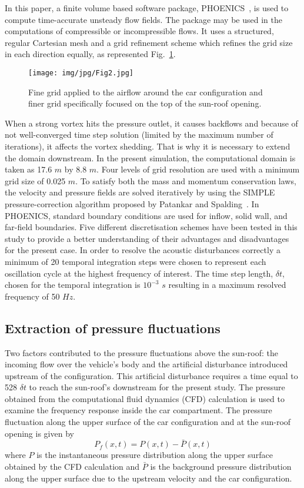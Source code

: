 \documentclass[10pt]{article}
\theoremstyle{plain}
\theoremstyle{definition}
\theoremstyle{remark}
\begin{document}
In this paper, a finite volume based software package, PHOENICS~\cite{phoenics2014}, is used to compute time-accurate unsteady flow fields.
The package may be used in the computations of compressible or incompressible flows.
It uses a structured, regular Cartesian mesh and a grid refinement scheme which refines the grid size in each direction equally, as represented Fig.~\ref{Fig2}.
%
\begin{figure}[htbp]
\centering
\texttt{[image: img/jpg/Fig2.jpg]}
\caption{Fine grid applied to the airflow around the car configuration and finer grid specifically focused on the top of the sun-roof opening.}\label{Fig2}
\end{figure}
%

When a strong vortex hits the pressure outlet, it causes backflows and because of not well-converged time step solution (limited by the maximum number of iterations), it affects the vortex shedding.
That is why it is necessary to extend the domain downstream.
In the present simulation, the computational domain is taken as 17.6 $m$ by 8.8 $m$.
Four levels of grid resolution are used with a minimum grid size of 0.025 $m$.
To satisfy both the mass and momentum conservation laws, the velocity and pressure fields are solved iteratively by using the SIMPLE pressure-correction algorithm proposed by Patankar and Spalding~\cite{Patankar1980}.
In PHOENICS, standard boundary conditions are used for inflow, solid wall, and far-field boundaries.
Five different discretisation schemes have been tested in this study to provide a better understanding of their advantages and disadvantages for the present case.
In order to resolve the acoustic disturbances correctly a minimum of 20 temporal integration steps were chosen to represent each oscillation cycle at the highest frequency of interest.
The time step length, $\delta t$, chosen for the temporal integration is $10^{-3}$ $s$ resulting in a maximum resolved frequency of 50 $Hz$.


\subsection{Extraction of pressure fluctuations}

Two factors contributed to the pressure fluctuations above the sun-roof: the incoming flow over the vehicle's body and the artificial disturbance introduced upstream of the configuration.
This artificial disturbance requires a time equal to 528 $\delta t$ to reach the sun-roof's downstream for the present study.
The pressure obtained from the computational fluid dynamics (CFD) calculation is used to examine the frequency response inside the car compartment.
The pressure fluctuation along the upper surface of the car configuration and at the sun-roof opening is given by
%
$$P_f (x,t) = P(x,t) - \bar{P}(x,t)$$
%
where $P$ is the instantaneous pressure distribution along the upper surface obtained by the CFD calculation and $\bar{P}$ is the background pressure distribution along the upper surface due to the upstream velocity and the car configuration.
\end{document}
